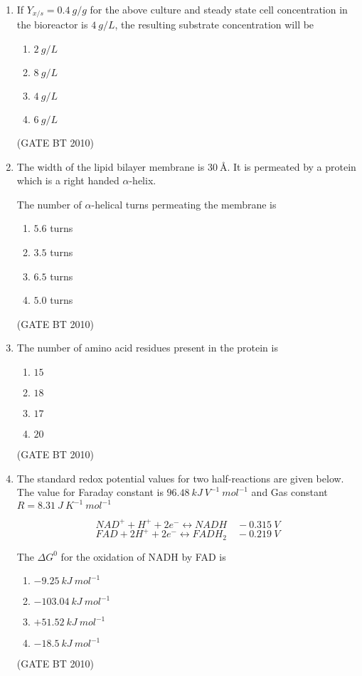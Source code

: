 \documentclass[journal,12pt,onecolumn]{IEEEtran}
\theoremstyle{remark}
\begin{document}
\begin{enumerate}
\item If $Y_{x/s}=0.4\ g/g$ for the above culture and steady state cell concentration in the bioreactor is $4\ g/L$, the resulting substrate concentration will be
\begin{enumerate}
   \item $2\ g/L$
   \item $8\ g/L$
   \item $4\ g/L$
   \item $6\ g/L$
\end{enumerate}
\hfill (GATE BT 2010)

\item The width of the lipid bilayer membrane is $30\ \text{\AA}$. It is permeated by a protein which is a right handed $\alpha$-helix.  

The number of $\alpha$-helical turns permeating the membrane is
\begin{enumerate}
   \item $5.6$ turns
   \item $3.5$ turns
   \item $6.5$ turns
   \item $5.0$ turns
\end{enumerate}
\hfill (GATE BT 2010)

\item The number of amino acid residues present in the protein is
\begin{enumerate}
   \item $15$
   \item $18$
   \item $17$
   \item $20$
\end{enumerate}
\hfill (GATE BT 2010)

\item The standard redox potential values for two half-reactions are given below. The value for Faraday constant is $96.48\ kJ\ V^{-1}\ mol^{-1}$ and Gas constant $R=8.31\ J\ K^{-1}\ mol^{-1}$  

\[
NAD^{+} + H^{+} + 2e^{-} \leftrightarrow NADH \quad -0.315\ V
\]  
\[
FAD + 2H^{+} + 2e^{-} \leftrightarrow FADH_{2} \quad -0.219\ V
\]

The $\Delta G^{0}$ for the oxidation of NADH by FAD is
\begin{enumerate}
   \item $-9.25\ kJ\ mol^{-1}$
   \item $-103.04\ kJ\ mol^{-1}$
   \item $+51.52\ kJ\ mol^{-1}$
   \item $-18.5\ kJ\ mol^{-1}$
\end{enumerate}
\hfill (GATE BT 2010)


\end{enumerate}
\end{document}
